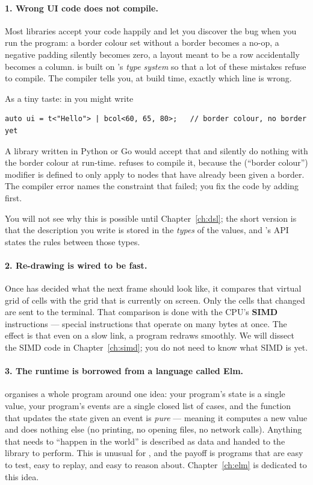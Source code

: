 \paragraph{1. Wrong UI code does not compile.}
Most libraries accept your code happily and let you discover the bug
when you run the program: a border colour set without a border becomes
a no-op, a negative padding silently becomes zero, a layout meant to
be a row accidentally becomes a column. \maya{} is built on \cpp{}'s
\emph{type system} so that a lot of these mistakes refuse to compile.
The compiler tells you, at build time, exactly which line is wrong.

As a tiny taste: in \maya{} you might write

\begin{lstlisting}
auto ui = t<"Hello"> | bcol<60, 65, 80>;   // border colour, no border yet
\end{lstlisting}

A library written in Python or Go would accept that and silently do
nothing with the border colour at run-time. \maya{} refuses to
compile it, because the  (``border colour'') modifier is
defined to only apply to nodes that have already been given a
border. The compiler error names the constraint that failed; you fix
the code by adding  first.

You will not see why this is possible until Chapter~\ref{ch:dsl}; the
short version is that the description you write is stored in the
\emph{types} of the \cpp{} values, and \maya{}'s API states the rules
between those types.

\paragraph{2. Re-drawing is wired to be fast.}
Once \maya{} has decided what the next frame should look like, it
compares that virtual grid of cells with the grid that is currently on
screen. Only the cells that changed are sent to the terminal. That
comparison is done with the CPU's \textbf{SIMD} instructions ---
special instructions that operate on many bytes at once. The effect
is that even on a slow  link, a \maya{} program redraws
smoothly. We will dissect the SIMD code in Chapter~\ref{ch:simd}; you
do not need to know what SIMD is yet.

\paragraph{3. The runtime is borrowed from a language called Elm.}
\maya{} organises a whole program around one idea: your program's
state is a single value, your program's events are a single closed
list of cases, and the function that updates the state given an event
is \emph{pure} --- meaning it computes a new value and does nothing
else (no printing, no opening files, no network calls). Anything that
needs to ``happen in the world'' is described as data and handed to
the library to perform. This is unusual for \cpp{}, and the payoff is
programs that are easy to test, easy to replay, and easy to reason
about. Chapter~\ref{ch:elm} is dedicated to this idea.


